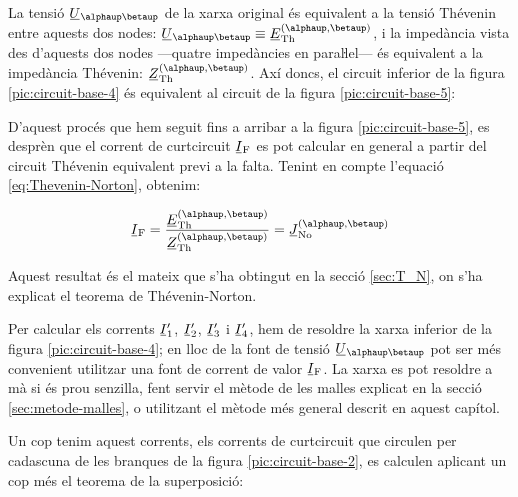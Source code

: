 \begin{center}
	
	\label{pic:circuit-base-4}
\end{center}

La tensió $\cmplx{U}_{\alphaup\betaup}$ de la xarxa original és equivalent a la tensió Thévenin entre aquests dos nodes: $\cmplx{U}_{\alphaup\betaup} \equiv \cmplx{E}\ped{Th}^{(\alphaup, \betaup)}$, i la impedància vista des d'aquests dos nodes ---quatre impedàncies en paraŀlel--- és equivalent a la impedància Thévenin: $\cmplx{Z}\ped{Th}^{(\alphaup, \betaup)}$. Axí doncs, el circuit inferior de la figura  \vref{pic:circuit-base-4} és equivalent al circuit de la figura \vref{pic:circuit-base-5}:

\begin{center}
	
	\label{pic:circuit-base-5}
\end{center}

D'aquest procés que hem seguit fins a arribar a la figura \vref{pic:circuit-base-5}, es desprèn que el corrent de curtcircuit $\cmplx{I}\ped{F}$ es pot calcular en general a partir del circuit Thévenin equivalent previ a la falta. Tenint en compte l'equació \eqref{eq:Thevenin-Norton}, obtenim:

\begin{equation}
	\cmplx{I}\ped{F} = \frac{\cmplx{E}\ped{Th}^{(\alphaup, \betaup)}}{\cmplx{Z}\ped{Th}^{(\alphaup, \betaup)}}
	= \cmplx{J}\ped{No}^{(\alphaup, \betaup)}
\end{equation}

Aquest resultat és el mateix que s'ha obtingut en la secció \ref{sec:T_N}, on s'ha explicat el teorema de Thévenin-Norton.

Per calcular els corrents $\cmplx{I}_1'$, $\cmplx{I}_2'$, $\cmplx{I}_3'$ i $\cmplx{I}_4'$, hem de resoldre la xarxa inferior de la figura \vref{pic:circuit-base-4}; en lloc de la font de tensió $\cmplx{U}_{\alphaup\betaup}$ pot ser més convenient utilitzar una font de corrent de valor $\cmplx{I}\ped{F}$. La xarxa es pot resoldre a mà si és prou senzilla, fent servir el mètode de les malles explicat en la secció \vref{sec:metode-malles}, o utilitzant el mètode més general descrit en aquest capítol.

Un cop tenim aquest corrents, els corrents de curtcircuit que circulen per cadascuna de les branques de la figura \vref{pic:circuit-base-2}, es calculen  aplicant un cop més el teorema de la superposició:

